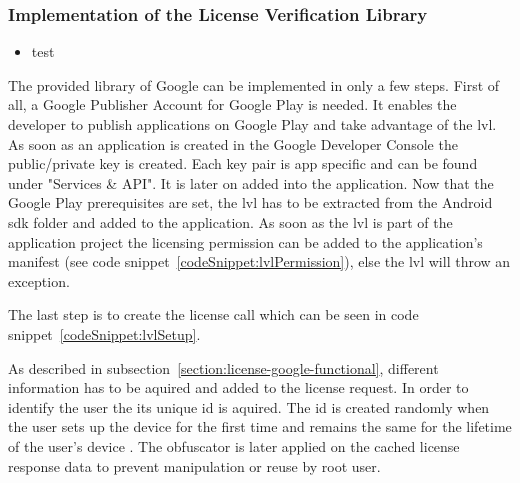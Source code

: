 \subsubsection{Implementation of the License Verification Library} \label{section:license-google-implementation}
\begin{itemize}
    \item test
\end{itemize}
The provided library of Google can be implemented in only a few steps.
First of all, a Google Publisher Account for Google Play is needed.
It enables the developer to publish applications on Google Play and take advantage of the \gls{lvl}.
As soon as an application is created in the Google Developer Console the public/private key is created.
Each key pair is app specific and can be found under "Services \& API".
It is later on added into the application. \cite{developersLicensingSetup}
\newline
Now that the Google Play prerequisites are set, the \gls{lvl} has to be extracted from the Android \gls{sdk} folder and added to the application.
As soon as the \gls{lvl} is part of the application project the licensing permission can be added to the application's manifest (see code snippet~\ref{codeSnippet:lvlPermission}), else the \gls{lvl} will throw an exception.

The last step is to create the license call which can be seen in code snippet~\ref{codeSnippet:lvlSetup}.

As described in subsection~\ref{section:license-google-functional}, different information has to be aquired and added to the license request.
In order to identify the user the its unique id is aquired.
The id is created randomly when the user sets up the device for the first time and remains the same for the lifetime of the user's device \cite{androidSecure}.
The obfuscator is later applied on the cached license response data to prevent manipulation or reuse by root user.
